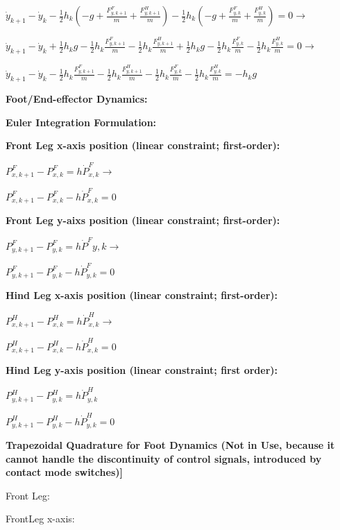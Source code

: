 \documentclass[a4paper,10pt]{article}
\begin{document}
$\dot{y}_{k+1}-\dot{y}_k-\frac{1}{2}h_k(-g+\frac{F^F_{y,k+1}}{m}+\frac{F^H_{y,k+1}}{m})-\frac{1}{2}h_k(-g+\frac{F^F_{y,k}}{m}+\frac{F^H_{y,k}}{m}) = 0 \rightarrow $

$\dot{y}_{k+1}-\dot{y}_k + \frac{1}{2}h_kg - \frac{1}{2}h_k\frac{F^F_{y,k+1}}{m} - \frac{1}{2}h_k\frac{F^H_{y,k+1}}{m} + \frac{1}{2}h_kg - \frac{1}{2}h_k\frac{F^F_{y,k}}{m} - \frac{1}{2}h_k\frac{F^H_{y,k}}{m} = 0 \rightarrow$

$\dot{y}_{k+1}-\dot{y}_k  - \frac{1}{2}h_k\frac{F^F_{y,k+1}}{m} - \frac{1}{2}h_k\frac{F^H_{y,k+1}}{m}  - \frac{1}{2}h_k\frac{F^F_{y,k}}{m} - \frac{1}{2}h_k\frac{F^H_{y,k}}{m} = - h_kg$

\vspace{10mm}

\textbf{Foot/End-effector Dynamics:}

\vspace{2mm}

\textbf{Euler Integration Formulation: }

\textbf{Front Leg x-axis position (linear constraint; first-order): }

$P^F_{x,k+1} - P^F_{x,k} = h\dot{P}^F_{x,k} \rightarrow$

$P^F_{x,k+1} - P^F_{x,k} - h\dot{P}^F_{x,k} = 0$

\textbf{Front Leg y-aixs position (linear constraint; first-order): }

$P^F_{y,k+1} - P^F_{y,k} = h\dot{P}^F{y,k} \rightarrow$

$P^F_{y,k+1} - P^F_{y,k} - h\dot{P}^F_{y,k} = 0 $

\textbf{Hind Leg x-axis position (linear constraint; first-order):}

$P^H_{x,k+1} - P^H_{x,k} = h\dot{P}^H_{x,k} \rightarrow$

$P^H_{x,k+1} - P^H_{x,k} - h\dot{P}^H_{x,k} = 0$

\textbf{Hind Leg y-axis position (linear constraint; first order): }

$P^H_{y,k+1} - P^H_{y,k} = h\dot{P}^H_{y,k}$

$P^H_{y,k+1} - P^H_{y,k} - h\dot{P}^H_{y,k} = 0$

\vspace{5mm}

\textbf{Trapezoidal Quadrature for Foot Dynamics (Not in Use, because it cannot handle the discontinuity of control signals, introduced by contact mode switches)]}

Front Leg:

FrontLeg x-axis: 
\end{document}
